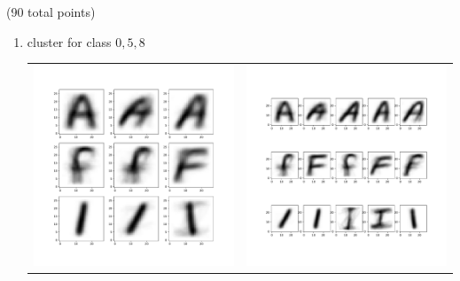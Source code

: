\documentclass[12pt]{article}
\begin{document}
\begin{question}{(90 total points) \qTwoTitle}
\begin{subquestion}
  \begin{answerbox}{0.75\textheight}
    \begin{enumerate}
    \item cluster for class $0,5,8$
        \begin{center}
        \begin{tabular}{l l}
             \includegraphics[scale=0.3]{cluster_3.pdf}& 
             \includegraphics[scale=0.3]{cluster_5.pdf}

\end{tabular}
\end{center}
\end{enumerate}
\end{answerbox}
\end{subquestion}
\end{question}
\end{document}
